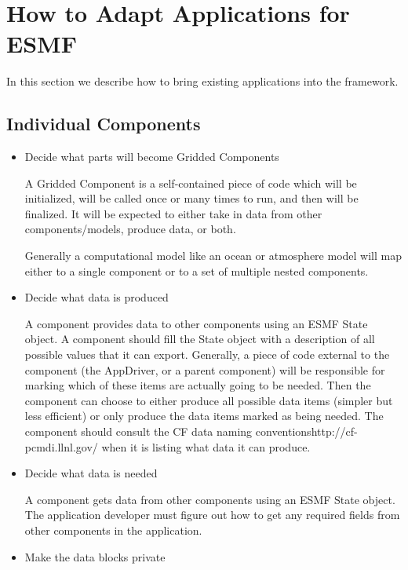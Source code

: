 
\section{How to Adapt Applications for ESMF}
\label{sec:Adoption}

In this section we describe how to bring existing applications 
into the framework.

\subsection{Individual Components}

\begin{itemize}

\item Decide what parts will become Gridded Components 

A Gridded Component is a self-contained
piece of code which will be initialized, will be called once or many times
to run, and then will be finalized.  It will be expected to either take in
data from other components/models, produce data, or both.

Generally a computational model like an ocean or atmosphere model will
map either to a single component or to a set of multiple nested
components.

\item Decide what data is produced 

A component provides data to other components using an ESMF State
object.  A component should fill the State object with a description of
all possible values that it can export.  Generally, a piece of code
external to the component (the AppDriver, or a parent component) will 
be responsible for marking which of these items are actually going to
be needed.  Then the component can choose to either produce all possible
data items (simpler but less efficient) or only produce the data items
marked as being needed.  The component should consult the \htmladdnormallink
{CF data naming conventions}{http://cf-pcmdi.llnl.gov/} when it is listing
what data it can produce.

\item Decide what data is needed 

A component gets data from other components using an ESMF State object.
The application developer must figure out how to get any required 
fields from other components in the application.

\item Make the data blocks private 


\end{itemize}
